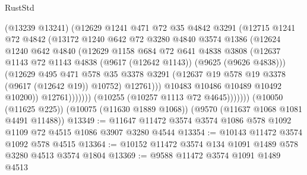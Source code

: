 \begin{lexlean}{RustStd}
\begin{coremodule}
{\begin{coremodule}
{{{{{{{{{{{{{{{{{{{{{{{{{{{{{{{{{                          (@13239 @13241)
                          (@12629
                            @1241
                            @471
                            @72
                            @35
                            @4842
                            @3291
                            (@12715
                              @1241
                              @72
                              @4842
                              (@13172
                                @1240
                                @642
                                @72
                                @3280
                                @4840
                                @3574
                                @1386
                                (@12624
                                  @1240
                                  @642
                                  @4840
                                  (@12629
                                    @1158
                                    @684
                                    @72
                                    @641
                                    @4838
                                    @3808
                                    (@12637
                                      @1143
                                      @72
                                      @1143
                                      @4838
                                      (@9617 (@12642 @1143))
                                      (@9625 (@9626 @4838)))
                                    (@12629
                                      @495
                                      @471
                                      @578
                                      @35
                                      @3378
                                      @3291
                                      (@12637 @19 @578 @19 @3378 (@9617 (@12642 @19)) @10752)
                                      @12761)))
                                @10483
                                @10486
                                @10489
                                @10492
                                @10200))
                            @12761)))))))
              (@10255 (@10257 @1113 @72 @4645)))))))
    (@10050 (@11625 @225))
    (@10075 (@11630 @1889 @1068))
    (@9570 (@11637 @1068 @1081 @4491 @11488))
@13349 := @11647 @11472 @3574 @3574 @1086 @578 @1092 @1109 @72 @4515 @1086 @3907 @3280 @4544
@13354 := @10143 @11472 @3574 @1092 @578 @4515
@13364 := @10152 @11472 @3574 @134 @1091 @1489 @578 @3280 @4513 @3574 @1804
@13369 := @9588 @11472 @3574 @1091 @1489 @4513
}}}}}}}}}}}}}}}}}}}}}}}}}}}}}}}}}
\end{coremodule}}
\end{coremodule}
\end{lexlean}
